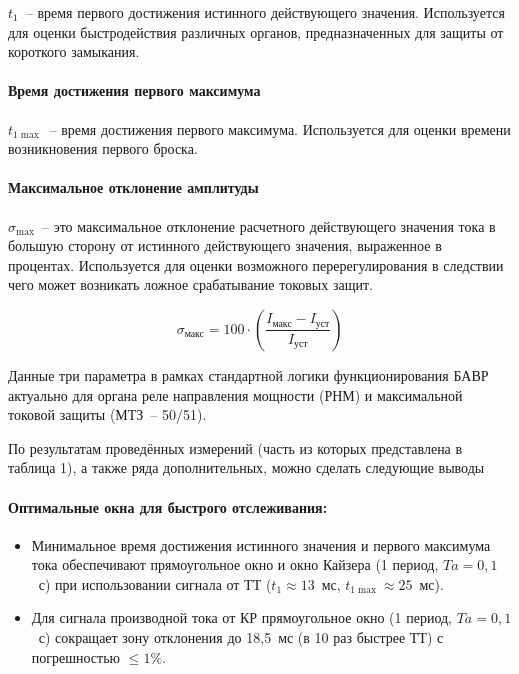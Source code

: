 $t_1$~-- время первого достижения истинного действующего значения. Используется для оценки быстродействия различных органов, предназначенных для защиты от короткого замыкания.

\paragraph{Время достижения первого максимума}

$t_{1\max}$~-- время достижения первого максимума. Используется для оценки времени возникновения первого броска.

\paragraph{Максимальное отклонение амплитуды}

$\sigma_{\max}$~-- это максимальное отклонение расчетного действующего значения тока в большую сторону от истинного действующего значения, выраженное в процентах. Используется для оценки возможного перерегулирования в следствии чего может возникать ложное срабатывание токовых защит.

\begin{equation}
\label{eq:ch02_max_amplitude_deviation}
\sigma_{\text{макс}} = 100 \cdot \left( \frac{I_{\text{макс}} - I_{\text{уст}}}{I_{\text{уст}}} \right)
\end{equation}

Данные три параметра в рамках стандартной логики функционирования БАВР актуально для органа реле направления мощности (РНМ) и максимальной токовой защиты (МТЗ~-- 50/51).

По результатам проведённых измерений (часть из которых представлена в таблица 1), а также ряда дополнительных, можно сделать следующие выводы

\paragraph{Оптимальные окна для быстрого отслеживания:}
\begin{itemize}[noitemsep,topsep=2pt]
\item Минимальное время достижения истинного значения и первого максимума тока обеспечивают прямоугольное окно и окно Кайзера (1 период, $Ta=0{,}1$~с) при использовании сигнала от ТТ ($t_1 \approx 13$~мс, $t_{1\max} \approx 25$~мс).
\item Для сигнала производной тока от КР прямоугольное окно (1 период, $Ta=0{,}1$~с) сокращает зону отклонения до 18,5~мс (в 10 раз быстрее ТТ) с погрешностью $\le 1\%$.
\end{itemize}

